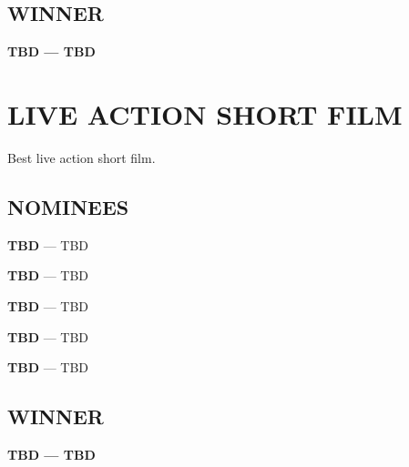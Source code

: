 \documentclass[letterpaper]{extarticle}
\begin{document}
  \subsection*{{\selectfont WINNER}}
  \textcolor{oscaryellow}{\textbf{{\selectfont TBD} — TBD}}

  \section*{\textcolor{oscaryellow}{{\selectfont LIVE ACTION SHORT FILM}}}
  \vspace{-6pt}
  {\selectfont Best live action short film.}
  \subsection*{{\selectfont NOMINEES}}
  \begin{multicols}{2}
    \begin{itemize}
      \begin{small}
        \item \textbf{{\selectfont TBD}} — TBD
        \item \textbf{{\selectfont TBD}} — TBD
        \item \textbf{{\selectfont TBD}} — TBD
        \item \textbf{{\selectfont TBD}} — TBD
        \item \textbf{{\selectfont TBD}} — TBD
      \end{small}
    \end{itemize}
  \end{multicols}

  \subsection*{{\selectfont WINNER}}
  \textcolor{oscaryellow}{\textbf{{\selectfont TBD} — TBD}}
\end{document}

